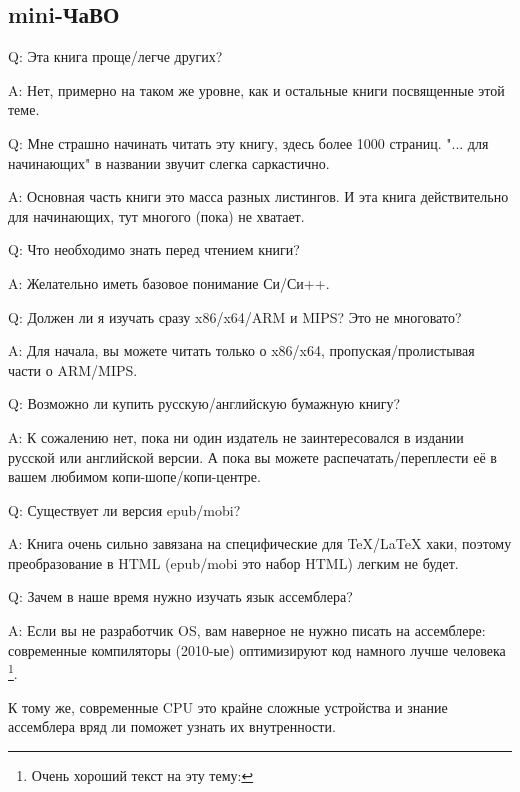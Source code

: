 \subsection*{mini-ЧаВО}

\par Q: Эта книга проще/легче других?
\par A: Нет, примерно на таком же уровне, как и остальные книги посвященные этой теме.

\par Q: Мне страшно начинать читать эту книгу, здесь более 1000 страниц.
"... для начинающих" в названии звучит слегка саркастично.
\par A: Основная часть книги это масса разных листингов.
И эта книга действительно для начинающих, тут многого (пока) не хватает.

\par Q: Что необходимо знать перед чтением книги?
\par A: Желательно иметь базовое понимание Си/Си++.

\par Q: Должен ли я изучать сразу x86/x64/ARM и MIPS? Это не многовато?
\par A: Для начала, вы можете читать только о x86/x64, пропуская/пролистывая части о ARM/MIPS.

\par Q: Возможно ли купить русскую/английскую бумажную книгу?
\par A: К сожалению нет, пока ни один издатель не заинтересовался в издании русской или английской версии.
А пока вы можете распечатать/переплести её в вашем любимом копи-шопе/копи-центре.

\par Q: Существует ли версия epub/mobi?
\par A: Книга очень сильно завязана на специфические для TeX/LaTeX хаки, поэтому преобразование в HTML (epub/mobi это набор HTML)
легким не будет.

\par Q: Зачем в наше время нужно изучать язык ассемблера?
\par A: Если вы не разработчик \ac{OS}, вам наверное не нужно писать на ассемблере: современные компиляторы (2010-ые) оптимизируют код намного лучше человека
\footnote{Очень хороший текст на эту тему: \InSqBrackets{\AgnerFog}}.

К тому же, современные \ac{CPU} это крайне сложные устройства и знание ассемблера вряд ли
поможет узнать их внутренности.

